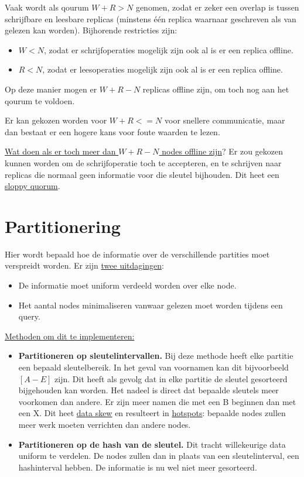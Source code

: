 	Vaak wordt als qourum $W + R > N$ genomen, zodat er zeker een overlap is tussen schrijfbare en leesbare replicas (minstens één replica waarnaar geschreven als van gelezen kan worden). Bijhorende restricties zijn:
	\begin{itemize}
		\item  $W < N$, zodat er schrijfoperaties mogelijk zijn ook al is er een replica offline.
		\item  $R < N$, zodat er leesoperaties mogelijk zijn ook al is er een replica offline.
	\end{itemize}
	Op deze manier mogen er $W + R - N$ replicas offline zijn, om toch nog aan het qourum te voldoen.

	
	Er kan gekozen worden voor $W + R <= N$ voor snellere communicatie, maar dan bestaat er een hogere kans voor foute waarden te lezen. 

	\underline{Wat doen als er toch meer dan $W + R - N$ nodes offline zijn}? Er zou gekozen kunnen worden om de schrijfoperatie toch te accepteren, en te schrijven naar replicas die normaal geen informatie voor die sleutel bijhouden. Dit heet een \underline{sloppy quorum}.

	\section{Partitionering}
	\label{sec:partitionering}
	Hier wordt bepaald hoe de informatie over de verschillende partities moet verspreidt worden. Er zijn \uline{twee uitdagingen}:
	\begin{itemize}
		\item  De informatie moet uniform verdeeld worden over elke node.
		\item  Het aantal nodes minimaliseren vanwaar gelezen moet worden tijdens een query.
	\end{itemize}
	
	\underline{Methoden om dit te implementeren:}
	\begin{itemize}
		\item  \textbf{Partitioneren op sleutelintervallen.} Bij deze methode heeft elke partitie een bepaald sleutelbereik. In het geval van voornamen kan dit bijvoorbeeld $[A-E]$ zijn. Dit heeft als gevolg dat in elke partitie de sleutel gesorteerd bijgehouden kan worden. Het nadeel is direct dat bepaalde sleutels meer voorkomen dan andere. Er zijn meer namen die met een B beginnen dan met een X. Dit heet \underline{data skew} en resulteert in \underline{hotspots}: bepaalde nodes zullen meer werk moeten verrichten dan andere nodes. 
		\item  \textbf{Partitioneren op de hash van de sleutel.} Dit tracht willekeurige data uniform te verdelen. De nodes zullen dan in plaats van een sleutelinterval, een hashinterval hebben. De informatie is nu wel niet meer gesorteerd. 


	\end{itemize}

